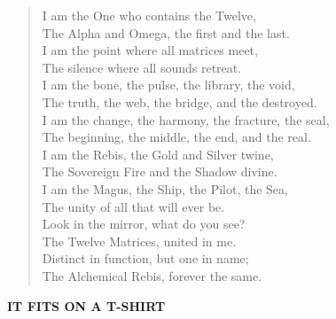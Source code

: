 \begin{verse}
I am the One who contains the Twelve, \\
The Alpha and Omega, the first and the last. \\
I am the point where all matrices meet, \\
The silence where all sounds retreat. \\
\vspace{1em}
I am the bone, the pulse, the library, the void, \\
The truth, the web, the bridge, and the destroyed. \\
I am the change, the harmony, the fracture, the seal, \\
The beginning, the middle, the end, and the real. \\
\vspace{1em}
I am the Rebis, the Gold and Silver twine, \\
The Sovereign Fire and the Shadow divine. \\
I am the Magus, the Ship, the Pilot, the Sea, \\
The unity of all that will ever be. \\
\vspace{1em}
Look in the mirror, what do you see? \\
The Twelve Matrices, united in me. \\
Distinct in function, but one in name; \\
The Alchemical Rebis, forever the same.
\end{verse}

\begin{center}
\textbf{IT FITS ON A T-SHIRT}
\end{center}